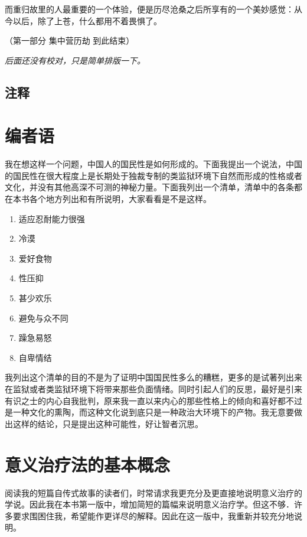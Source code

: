 \documentclass[11pt,oneside]{book}
\begin{document}
\begin{common-format}
而重归故里的人最重要的一个体验，便是历尽沧桑之后所享有的一个美妙感觉：从今以后，除了上苍，什么都用不着畏惧了。

（第一部分 集中营历劫 到此结束）

\emph{后面还没有校对，只是简单排版一下。}


\section{注释}
\showendnotes

\chapter{编者语}
我在想这样一个问题，中国人的国民性是如何形成的。下面我提出一个说法，中国的国民性在很大程度上是长期处于独裁专制的类监狱环境下自然而形成的性格或者文化，并没有其他高深不可测的神秘力量。下面我列出一个清单，清单中的各条都在本书各个地方列出和有所说明，大家看看是不是这样。
\begin{enumerate}
\item 适应忍耐能力很强 \pageref{适应}
\item 冷漠 \pageref{冷漠}
\item 爱好食物 \pageref{爱好食物}
\item 性压抑 \pageref{性压抑}
\item 甚少欢乐 \pageref{甚少快乐}
\item 避免与众不同 \pageref{不要与众不同}
\item 躁急易怒 \pageref{躁急易怒}
\item 自卑情结 \pageref{自卑情结}
\end{enumerate}

我列出这个清单的目的不是为了证明中国国民性多么的糟糕，更多的是试著列出来在监狱或者类监狱环境下将带来那些负面情绪。同时引起人们的反思，最好是引来有识之士的内心自我批判，原来我一直以来内心的那些性格上的倾向和喜好都不过是一种文化的熏陶，而这种文化说到底只是一种政治大环境下的产物。我无意要做出这样的结论，只是提出这种可能性，好让智者沉思。




\chapter{意义治疗法的基本概念}
阅读我的短篇自传式故事的读者们，时常请求我更充分及更直接地说明意义治疗的学说。因此我在本书第一版中，增加简短的篇幅来说明意义治疗学。但这不够．许多要求围困住我，希望能作更详尽的解释。因此在这一版中，我重新并较充分地说明。


\end{common-format}
\end{document}

